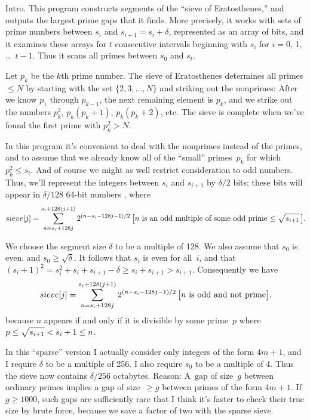 
\datethis

Intro. This program constructs segments of the ``sieve of
Eratosthenes,''
and outputs the largest prime gaps that it finds. More precisely, it
works with sets of prime numbers between $s_i$ and $s_{i+1}=s_i+\delta$,
represented as an array of bits, and it examines these arrays for
$t$ consecutive intervals beginning with $s_i$ for $i=0$, 1, \dots~$t-1$.
Thus it scans all primes between $s_0$ and $s_t$.

Let $p_k$ be the $k$th prime number. The sieve of Eratosthenes determines
all primes $\le N$ by starting with the set $\{2,3,\ldots,N\}$ and striking
out the nonprimes: After we know $p_1$ through $p_{k-1}$, the next remaining
element is $p_k$, and we strike out the numbers $p_k^2$, $p_k(p_k+1)$,
$p_k(p_k+2)$, etc. The sieve is complete when we've found the
first prime with $p_k^2>N$.

In this program it's convenient to deal with the nonprimes instead of the
primes, and to assume that we already know all of the ``small'' primes~$p_k$
for which $p_k^2\le s_t$.
And of course we might as well restrict consideration to odd numbers.
Thus, we'll represent the integers between $s_i$ and $s_{i+1}$ by
$\delta/2$ bits; these bits will appear in $\delta/128$ 64-bit numbers
, where
$$\PB{\\{sieve}[\|j]}=\sum_{n=s_i+128j}^{s_i+128(j+1)} 2^{(n-s_i-128j-1)/2}
\,\hbox{$\bigl[n$ is an odd multiple of some odd prime
$\le\sqrt{\mathstrut s_{i+1}}\,\bigr]$}.$$

We choose the segment size $\delta$ to be a multiple of 128.
We also assume that $s_0$ is even, and $s_0\ge\sqrt\delta$. It follows
that $s_i$ is even for all~$i$, and that $(s_i+1)^2=s_i^2+s_i+s_{i+1}-\delta
\ge s_i+s_{i+1}>s_{i+1}$. Consequently we have
$$\PB{\\{sieve}[\|j]}=\sum_{n=s_i+128j}^{s_i+128(j+1)} 2^{(n-s_i-128j-1)/2}
\,\hbox{$\bigl[n$ is odd and not prime$\bigr]$},$$
because $n$ appears if and only if it is divisible by some prime~$p$
where $p\le\sqrt{\mathstrut s_{i+1}}<s_i+1\le n$.

In this ``sparse'' version I actually consider only integers of the
form $4m+1$, and I require $\delta$ to be a multiple of 256.
I also require $s_0$ to be a multiple of 4.
Thus the sieve now contains $\delta/256$ octabytes.
Reason: A~gap of size~$g$ between ordinary primes implies a
gap of size~$\ge g$ between primes of the form $4m+1$. If $g\ge1000$,
such gaps are sufficiently rare that I think it's faster to check their
true size by brute force, because we save a factor of two with
the sparse sieve.

